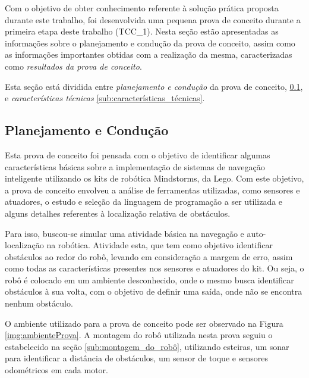 
	Com o objetivo de obter conhecimento referente à solução prática proposta durante este trabalho, foi desenvolvida uma pequena prova de conceito durante a primeira etapa deste trabalho (TCC\_1). Nesta seção estão apresentadas as informações sobre o planejamento e condução da prova de conceito, assim como as informações importantes obtidas com a realização da mesma, caracterizadas como \textit{resultados da prova de conceito}.

	Esta seção está dividida entre \textit{planejamento e condução} da prova de conceito, \ref{sub:planejamento_e_condução}, e \textit{características técnicas} \ref{sub:características_técnicas}.

	\subsection{Planejamento e Condução} %
	\label{sub:planejamento_e_condução}

		Esta prova de conceito foi pensada com o objetivo de identificar algumas características básicas sobre a implementação de sistemas de navegação inteligente utilizando os kits de robótica Mindstorms, da Lego. Com este objetivo, a prova de conceito envolveu a análise de ferramentas utilizadas, como sensores e atuadores, o estudo e seleção da linguagem de programação a ser utilizada e alguns detalhes referentes à localização relativa de obstáculos.

		Para isso, buscou-se simular uma atividade básica na navegação e auto-localização na robótica. Atividade esta, que tem como objetivo identificar obstáculos ao redor do robô, levando em consideração a margem de erro, assim como todas as características presentes nos sensores e atuadores do kit. Ou seja, o robô é colocado em um ambiente desconhecido, onde o mesmo busca identificar obstáculos à sua volta, com o objetivo de definir uma saída, onde não se encontra nenhum obstáculo.

		O ambiente utilizado para a prova de conceito pode ser observado na Figura \ref{img:ambienteProva}. A montagem do robô utilizada nesta prova seguiu o estabelecido na seção \ref{sub:montagem_do_robô}, utilizando esteiras, um sonar para identificar a distância de obstáculos, um sensor de toque e sensores odométricos em cada motor.

